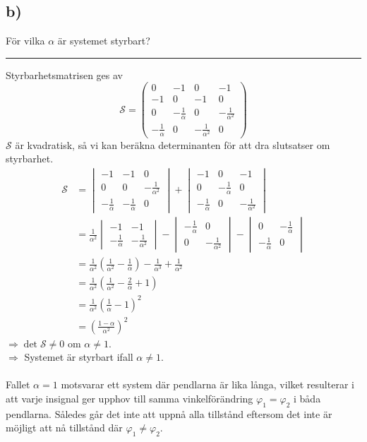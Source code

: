 \documentclass[12pt]{article}
\newcommand{\qline}{\hrule \vspace*{10pt}}
\begin{document}
\subsection*{b)}
För vilka $\alpha$ är systemet styrbart?
\qline
Styrbarhetsmatrisen ges av
\[\mathcal{S} = \begin{pmatrix}
0 & -1 & 0 & -1 \\
-1 & 0 & -1 & 0 \\
0 & -\frac{1}{\alpha} & 0 & -\frac{1}{\alpha^2} \\
-\frac{1}{\alpha} & 0 & -\frac{1}{\alpha^2} & 0
\end{pmatrix} \]
$\mathcal{S}$ är kvadratisk, så vi kan beräkna determinanten för att dra slutsatser om styrbarhet.
\begin{align*}
{\mathcal{S}} &= \begin{vmatrix}
-1 & -1 & 0 \\
0 & 0 & -\frac{1}{\alpha^2} \\
-\frac{1}{\alpha} & -\frac{1}{\alpha} & 0
\end{vmatrix} + \begin{vmatrix}
-1 & 0 & -1 \\
0 & -\frac{1}{\alpha} & 0 \\
-\frac{1}{\alpha} & 0 & -\frac{1}{\alpha^2}
\end{vmatrix} \\
&= \frac{1}{\alpha^2}\begin{vmatrix}
-1 & -1 \\
-\frac{1}{\alpha} & -\frac{1}{\alpha^2}
\end{vmatrix} - \begin{vmatrix}
-\frac{1}{\alpha} & 0 \\
0 & -\frac{1}{\alpha^2}
\end{vmatrix} - \begin{vmatrix}
0 & -\frac{1}{\alpha} \\
-\frac{1}{\alpha} & 0
\end{vmatrix} \\
&= \frac{1}{\alpha^2}\left(\frac{1}{\alpha^2} - \frac{1}{\alpha}\right) - \frac{1}{\alpha^3} + \frac{1}{\alpha^2} \\
&= \frac{1}{\alpha^2}\left(\frac{1}{\alpha^2} - \frac{2}{\alpha} + 1\right) \\
&= \frac{1}{\alpha^2}\left(\frac{1}{\alpha} - 1\right)^2 \\
&= \left(\frac{1-\alpha}{\alpha^2}\right)^2
\end{align*}
$\Rightarrow \det{\mathcal{S}} \neq 0$ om $\alpha \neq 1$. \\
$\Rightarrow$ Systemet är styrbart ifall $\alpha \neq 1$. \\\\
Fallet $\alpha = 1$ motsvarar ett system där pendlarna är lika långa, vilket resulterar i att  varje insignal ger upphov till samma vinkelförändring $\varphi_1 = \varphi_2$ i båda pendlarna. Således går det inte att uppnå alla tillstånd eftersom det inte är möjligt att nå tillstånd där $\varphi_1 \neq \varphi_2$.\\
\end{document}
